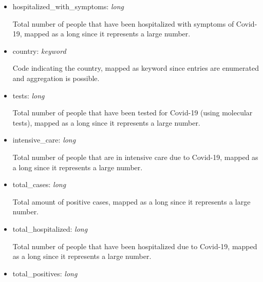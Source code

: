 \documentclass[12pt, a4paper]{article}
\begin{document}
\begin{itemize}
\begin{itemize}
\begin{footnotesize}
        \end{footnotesize}
      \item hospitalized\_with\_symptoms: \emph{long} \\
        \begin{footnotesize}
          Total number of people that have been hospitalized with symptoms of Covid-19,
          mapped as a long since it represents a large number.
        \end{footnotesize}
      \item country: \emph{keyword} \\
        \begin{footnotesize}
          Code indicating the country, mapped as keyword since entries are 
          enumerated and aggregation is possible.
        \end{footnotesize}
      \item tests: \emph{long} \\
        \begin{footnotesize}
          Total number of people that have been tested for Covid-19 (using molecular 
          tests), mapped as a long since it represents a large number.
        \end{footnotesize}
      \item intensive\_care: \emph{long} \\
        \begin{footnotesize}
          Total number of people that are in intensive care due to Covid-19, mapped as 
          a long since it represents a large number.
        \end{footnotesize}
      \item total\_cases: \emph{long} \\
        \begin{footnotesize}
          Total amount of positive cases, mapped as a long since it represents a large 
          number.
        \end{footnotesize}
      \item total\_hospitalized: \emph{long} \\
        \begin{footnotesize}
          Total number of people that have been hospitalized due to Covid-19, mapped as 
          a long since it represents a large number.
        \end{footnotesize}
      \item total\_positives: \emph{long} \\
        \begin{footnotesize}

\end{footnotesize}
\end{itemize}
\end{itemize}
\end{document}
